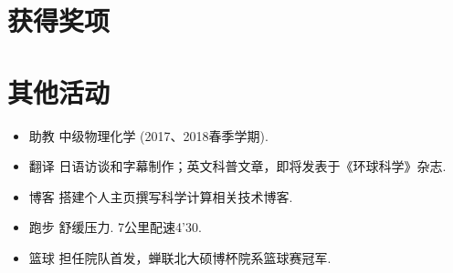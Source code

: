 {%
}


\begin{multicols}{2}
\section{\hei 获得奖项}


{
\setlength{\parskip}{-5pt}
    
\setlength{\parskip}{-20pt}


\setlength{\parskip}{-10pt}


\setlength{\parskip}{2pt}


}

\section{\hei 其他活动}
{
    \begin{itemize}
        \setlength{\parskip}{3pt}
        \item {\hei 助教} 中级物理化学 (2017、2018春季学期).
        \item {\hei 翻译} 日语访谈和字幕制作；英文科普文章，即将发表于《环球科学》杂志.
        \item {\hei 博客} 搭建个人主页撰写科学计算相关技术博客.
        \item {\hei 跑步} 舒缓压力. 7公里配速4'30.
        \item {\hei 篮球} 担任院队首发，蝉联北大硕博杯院系篮球赛冠军.
    \end{itemize}
}
\end{multicols}
